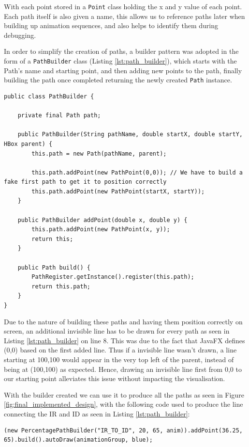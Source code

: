 With each point stored in a \texttt{Point} class holding the x and y value of each point. Each path itself is also given a name, this allows us to reference paths later when building up animation sequences, and also helps to identify them during debugging.

In order to simplify the creation of paths, a builder pattern was adopted in the form of a \texttt{PathBuilder} class (Listing \ref{lst:path_builder}), which starts with the Path's name and starting point, and then adding new points to the path, finally building the path once completed returning the newly created \texttt{Path} instance.

\begin{lstlisting}[caption=Path Builder, label=lst:path_builder]
public class PathBuilder {

    private final Path path;

    public PathBuilder(String pathName, double startX, double startY, HBox parent) {
        this.path = new Path(pathName, parent);

        this.path.addPoint(new PathPoint(0,0)); // We have to build a fake first path to get it to position correctly
        this.path.addPoint(new PathPoint(startX, startY));
    }

    public PathBuilder addPoint(double x, double y) {
        this.path.addPoint(new PathPoint(x, y));
        return this;
    }
    
    public Path build() {
        PathRegister.getInstance().register(this.path);
        return this.path;
    }
}
\end{lstlisting}

Due to the nature of building these paths and having them position correctly on screen, an additional invisible line has to be drawn for every path as seen in Listing \ref{lst:path_builder} on line 8. This was due to the fact that JavaFX \cite{sunmicrosystems_2022_javafx} defines (0,0) based on the first added line. Thus if a invisible line wasn't drawn, a line starting at 100,100 would appear in the very top left of the parent, instead of being at (100,100) as expected. Hence, drawing an invisible line first from 0,0 to our starting point alleviates this issue without impacting the visualisation.

With the builder created we can use it to produce all the paths as seen in Figure \ref{fig:final_implemented_design}, with the following code used to produce the line connecting the \ac{IR} and \ac{ID} as seen in Listing \ref{lst:path_builder}:
\begin{lstlisting}[caption=Example of use the path builder, label=lst:path_builder]
(new PercentagePathBuilder("IR_TO_ID", 20, 65, anim)).addPoint(36.25, 65).build().autoDraw(animationGroup, blue);
\end{lstlisting}

